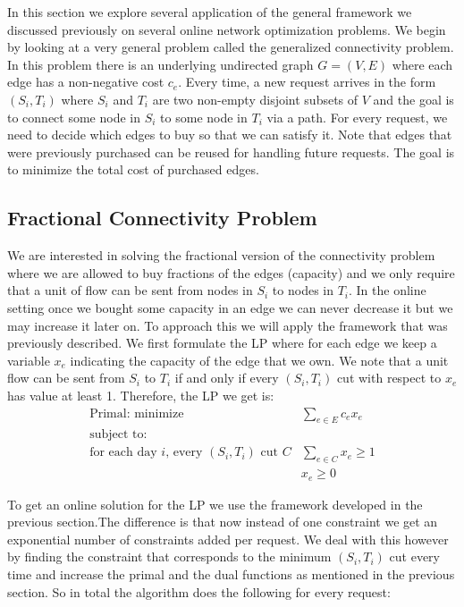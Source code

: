 In this section we explore several application of the general framework we discussed previously on several online network optimization problems. We begin by looking at a very general problem called the generalized connectivity problem. In this problem there is an underlying undirected graph $G = (V,E)$ where each edge has a non-negative cost $c_e$. Every time, a new request arrives in the form $(S_i,T_i)$ where $S_i$ and $T_i$ are two non-empty disjoint subsets of $V$ and the goal is to connect some node in $S_i$ to some node in $T_i$ via a path. For every request, we need to decide which edges to buy so that we can satisfy it. Note that edges that were previously purchased can be reused for handling future requests. The goal is to minimize the total cost of purchased edges.

\subsection{Fractional Connectivity Problem}

We are interested in solving the fractional version of the connectivity problem where we are allowed to buy fractions of the edges (capacity) and we only require that a unit of flow can be sent from nodes in $S_i$ to nodes in $T_i$. In the online setting once we bought some capacity in an edge we can never decrease it but we may increase it later on. To approach this we will apply the framework that was previously described. We first formulate the LP where for each edge we keep a variable $x_e$ indicating the capacity of the edge that we own. We note that a unit flow can be sent from $S_i$ to $T_i$ if and only if every $(S_i, T_i)$ cut with respect to $x_e$ has value at least 1. Therefore, the LP we get is: 
\[
	\begin{array}{lr}
	\textrm{Primal: minimize}   & \sum_{e \in E} c_e x_e   \\
	\textrm{subject to:} & \\
	\textrm{for each day $i$, every $(S_i,T_i)$ cut $C$} & \sum_{e \in C} x_e  \ge 1  \\
			    & x_e \geq 0
	\end{array}
\]

To get an online solution for the LP we use the framework developed in the previous section.The difference is that now instead of one constraint we get an exponential number of constraints added per request. We deal with this however by finding the constraint that corresponds to the minimum $(S_i,T_i)$ cut every time and increase the primal and the dual functions as mentioned in the previous section. So in total the algorithm does the following for every request:

